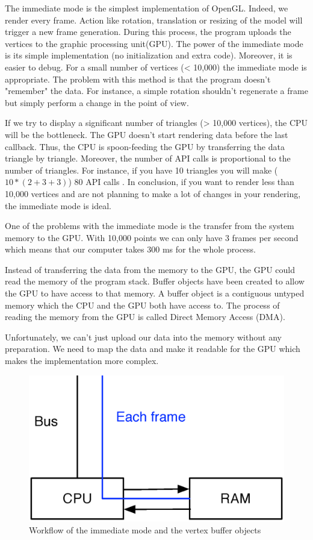 The immediate mode is the simplest implementation of OpenGL. Indeed, we render every frame. Action like rotation, translation or resizing of the model will trigger a new frame generation. During this process, the program uploads the vertices to the graphic processing unit(GPU). The power of the immediate mode is its simple implementation (no initialization and extra code). Moreover, it is easier to debug. For a small number of vertices (< 10,000) the immediate mode is appropriate. \cite{opengl1} The problem with this method is that the program doesn't "remember" the data. For instance, a simple rotation shouldn't regenerate a frame but simply perform a change in the point of view.

If we try to display a significant number of triangles (> 10,000 vertices), the CPU will be the bottleneck. The GPU doesn't start rendering data before the last callback. Thus, the CPU is spoon-feeding the GPU by transferring the data triangle by triangle. Moreover, the number of API calls is proportional to the number of triangles. For instance, if you have 10 triangles you will make ($10*(2+3+3)$) 80 API calls \cite{opengllegacy}. In conclusion, if you want to render less than 10,000 vertices and are not planning to make a lot of changes in your rendering, the immediate mode is ideal.

One of the problems with the immediate mode is the transfer from the system memory to the GPU. With 10,000 points we can only have 3 frames per second which means that our computer takes 300 ms for the whole process.

Instead of transferring the data from the memory to the GPU, the GPU could read the memory of the program stack. Buffer objects have been created to allow the GPU to have access to that memory. A buffer object is a contiguous untyped memory which the CPU and the GPU both have access to. The process of reading the memory from the GPU is called Direct Memory Access (DMA). 

Unfortunately, we can't just upload our data into the memory without any preparation. We need to map the data and make it readable for the GPU which makes the implementation more complex.

\begin{figure}[H]
  \centering
  \includegraphics[scale=0.4]{images/openglVBO.eps}
    \caption{Workflow of the immediate mode and the vertex buffer objects\cite{yaldex}}
  \label{openglVBO}
\end{figure}



